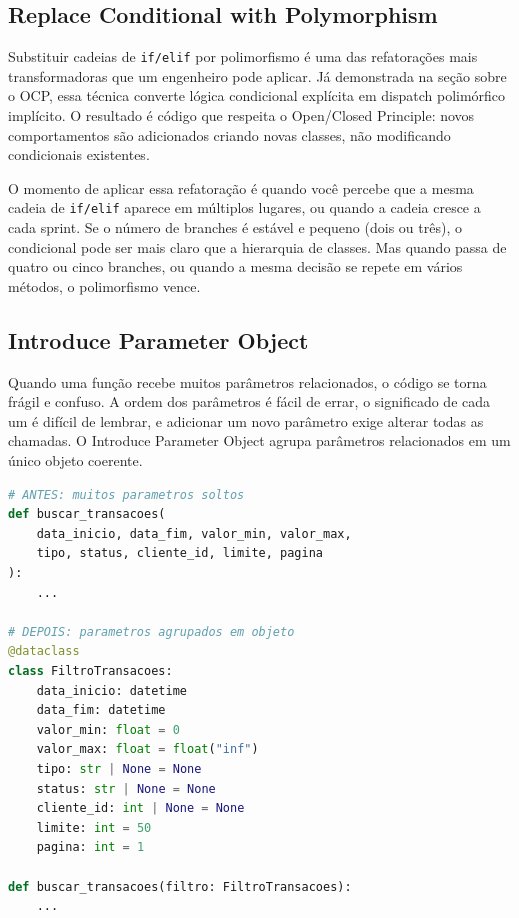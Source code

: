\subsection{Replace Conditional with Polymorphism}

Substituir cadeias de \texttt{if/elif} por polimorfismo é uma das
refatorações mais transformadoras que um engenheiro pode aplicar. Já
demonstrada na seção sobre o OCP, essa técnica converte lógica condicional
explícita em dispatch polimórfico implícito. O resultado é código que
respeita o Open/Closed Principle: novos comportamentos são adicionados
criando novas classes, não modificando condicionais existentes.

O momento de aplicar essa refatoração é quando você percebe que a mesma
cadeia de \texttt{if/elif} aparece em múltiplos lugares, ou quando a cadeia
cresce a cada sprint. Se o número de branches é estável e pequeno (dois ou
três), o condicional pode ser mais claro que a hierarquia de classes. Mas
quando passa de quatro ou cinco branches, ou quando a mesma decisão se
repete em vários métodos, o polimorfismo vence.

\subsection{Introduce Parameter Object}

Quando uma função recebe muitos parâmetros relacionados, o código se torna
frágil e confuso. A ordem dos parâmetros é fácil de errar, o significado
de cada um é difícil de lembrar, e adicionar um novo parâmetro exige
alterar todas as chamadas. O Introduce Parameter Object agrupa parâmetros
relacionados em um único objeto coerente.

\begin{lstlisting}[language=Python, caption={Refatoração: Introduce Parameter Object}]
# ANTES: muitos parametros soltos
def buscar_transacoes(
    data_inicio, data_fim, valor_min, valor_max,
    tipo, status, cliente_id, limite, pagina
):
    ...

# DEPOIS: parametros agrupados em objeto
@dataclass
class FiltroTransacoes:
    data_inicio: datetime
    data_fim: datetime
    valor_min: float = 0
    valor_max: float = float("inf")
    tipo: str | None = None
    status: str | None = None
    cliente_id: int | None = None
    limite: int = 50
    pagina: int = 1

def buscar_transacoes(filtro: FiltroTransacoes):
    ...
\end{lstlisting}

